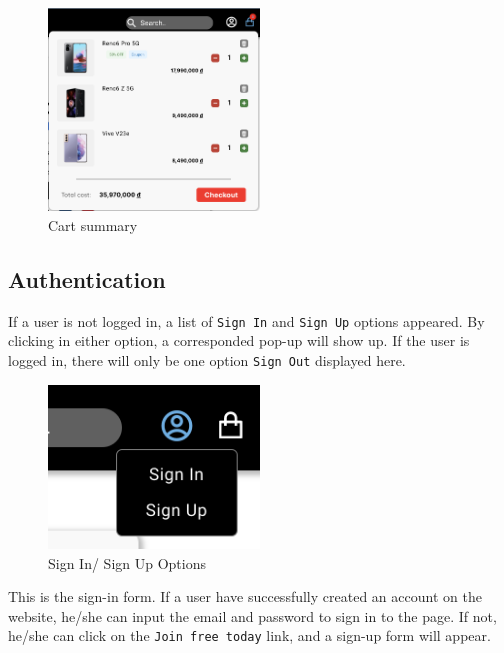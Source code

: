 \documentclass[a4paper]{article}
\numberwithin{equation}{section}
\begin{document}
\begin{figure}[H]
  \centering
  \includegraphics[width=0.5\textwidth]{assets/flow/cart-button.png}
  \caption{Cart summary}
\end{figure}

\subsection{Authentication}

If a user is not logged in, a list of {\tt Sign In} and {\tt Sign Up} options appeared.
By clicking in either option, a corresponded pop-up will show up.
If the user is logged in, there will only be one option {\tt Sign Out} displayed here.

\begin{figure}[H]
  \centering
  \includegraphics[width=0.5\textwidth]{assets/flow/not-signin.png}
  \caption{Sign In/ Sign Up Options}
\end{figure}

This is the sign-in form.
If a user have successfully created an account on the website, he/she can input the email and password to sign in to the page.
If not, he/she can click on the {\tt Join free today} link, and a sign-up form will appear.
\end{document}
